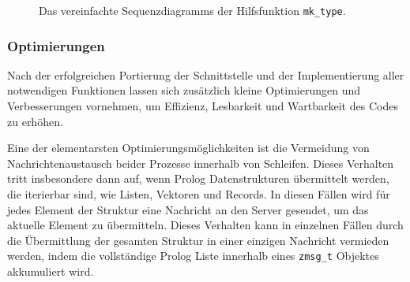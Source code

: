 \begin{figure}[!htp]
  \caption{Das vereinfachte Sequenzdiagramms der Hilfsfunktion \texttt{mk\_type}.}
  \label{fig:mk-type-sequence}
\end{figure}

\subsubsection{Optimierungen}
\label{subsec:optimizations}

Nach der erfolgreichen Portierung der Schnittstelle und der Implementierung aller notwendigen Funktionen
lassen sich zusätzlich kleine Optimierungen und Verbesserungen vornehmen, um Effizienz, Lesbarkeit und Wartbarkeit des Codes zu erhöhen.

Eine der elementarsten Optimierungsmöglichkeiten ist die Vermeidung von Nachrichtenaustausch beider Prozesse
innerhalb von Schleifen. Dieses Verhalten tritt insbesondere dann auf, wenn Prolog Datenstrukturen übermittelt werden,
die iterierbar sind, wie Listen, Vektoren und Records.
In diesen Fällen wird für jedes Element der Struktur eine Nachricht an den Server gesendet,
um das aktuelle Element zu übermitteln.
Dieses Verhalten kann in einzelnen Fällen durch die Übermittlung der gesamten Struktur in einer einzigen Nachricht vermieden werden,
indem die vollständige Prolog Liste innerhalb eines \texttt{zmsg\_t} Objektes akkumuliert wird.

